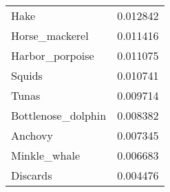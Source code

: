 \begin{tabular}{lr}
                            Hake &                0.012842 \\
                  Horse\_mackerel &                0.011416 \\
                 Harbor\_porpoise &                0.011075 \\
                          Squids &                0.010741 \\
                           Tunas &                0.009714 \\
              Bottlenose\_dolphin &                0.008382 \\
                         Anchovy &                0.007345 \\
                    Minkle\_whale &                0.006683 \\
                        Discards &                0.004476 \\
\bottomrule
\end{tabular}
